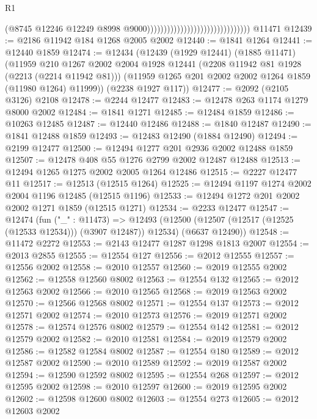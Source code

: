 \begin{lexlean}{R1}
\begin{coremodule}
                                                                (@8745
                                                                  @12246
                                                                  @12249
                                                                  @8998
                                                                  @9000)))))))))))))))))))))))))))))))
    @11471
@12439 := @2186 @11942 @184 @1268 @2005 @2002
@12440 := @1841 @1264
@12441 := @12440 @1859
@12474 := @12434
    (@12439
      (@1929 @12441)
      (@1885 @11471)
      (@11959
        @210
        @1267
        @2002
        @2004
        @1928
        @12441
        (@2208 @11942 @81 @1928 (@2213 (@2214 @11942 @81)))
        (@11959 @1265 @201 @2002 @2002 @1264 @1859 (@11980 @1264) @11999))
      (@2238 @1927 @117))
@12477 := @2092 (@2105 @3126) @2108
@12478 := @2244 @12477
@12483 := @12478 @263 @1174 @1279 @8000 @2002
@12484 := @1841 @1271
@12485 := @12484 @1859
@12486 := @10263 @12485
@12487 := @12440 @12486
@12488 := @1840 @12487
@12490 := @1841 @12488 @1859
@12493 := @12483 @12490 (@1884 @12490)
@12494 := @2199 @12477
@12500 := @12494 @1277 @201 @2936 @2002 @12488 @1859
@12507 := @12478 @408 @55 @1276 @2799 @2002 @12487 @12488
@12513 := @12494 @1265 @1275 @2002 @2005 @1264 @12486
@12515 := @2227 @12477 @11
@12517 := @12513 (@12515 @1264)
@12525 := @12494 @1197 @1274 @2002 @2004 @1196 @12485 (@12515 @1196)
@12533 := @12494 @1272 @201 @2002 @2002 @1271 @1859 (@12515 @1271)
@12534 := @2233 @12477
@12547 := @12474
    (fun ("_" : @11473) =>
    @12493 (@12500 (@12507 (@12517 (@12525 (@12533 @12534))) (@3907 @12487)) @12534) (@6637 @12490))
@12548 := @11472 @2272
@12553 := @2143 @12477 @1287 @1298 @1813 @2007
@12554 := @2013 @2855
@12555 := @12554 @127
@12556 := @2012 @12555
@12557 := @12556 @2002
@12558 := @2010 @12557
@12560 := @2019 @12555 @2002
@12562 := @12558 @12560 @8002
@12563 := @12554 @132
@12565 := @2012 @12563 @2002
@12566 := @2010 @12565
@12568 := @2019 @12563 @2002
@12570 := @12566 @12568 @8002
@12571 := @12554 @137
@12573 := @2012 @12571 @2002
@12574 := @2010 @12573
@12576 := @2019 @12571 @2002
@12578 := @12574 @12576 @8002
@12579 := @12554 @142
@12581 := @2012 @12579 @2002
@12582 := @2010 @12581
@12584 := @2019 @12579 @2002
@12586 := @12582 @12584 @8002
@12587 := @12554 @180
@12589 := @2012 @12587 @2002
@12590 := @2010 @12589
@12592 := @2019 @12587 @2002
@12594 := @12590 @12592 @8002
@12595 := @12554 @268
@12597 := @2012 @12595 @2002
@12598 := @2010 @12597
@12600 := @2019 @12595 @2002
@12602 := @12598 @12600 @8002
@12603 := @12554 @273
@12605 := @2012 @12603 @2002

\end{coremodule}
\end{lexlean}
